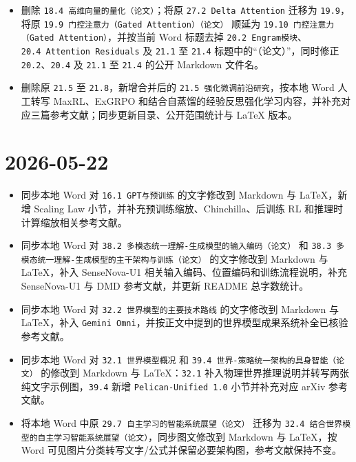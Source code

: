 \begin{itemize}
\item
  删除 \texttt{18.4\ 高维向量的量化（论文）}；将原 \texttt{27.2\ Delta\ Attention} 迁移为 \texttt{19.9}，将原 \texttt{19.9\ 门控注意力（Gated\ Attention）（论文）} 顺延为 \texttt{19.10\ 门控注意力（Gated\ Attention）}，并按当前 Word 标题去掉 \texttt{20.2\ Engram模块}、\texttt{20.4\ Attention\ Residuals} 及 \texttt{21.1} 至 \texttt{21.4} 标题中的``（论文）''，同时修正 \texttt{20.2}、\texttt{20.4} 及 \texttt{21.1} 至 \texttt{21.4} 的公开 Markdown 文件名。
\item
  删除原 \texttt{21.5} 至 \texttt{21.8}，新增合并后的 \texttt{21.5\ 强化微调前沿研究}，按本地 Word 人工转写 MaxRL、ExGRPO 和结合自蒸馏的经验反思强化学习内容，并补充对应三篇参考文献；同步更新目录、公开范围统计与 LaTeX 版本。
\end{itemize}

\hypertarget{section-3}{%
\section{2026-05-22}\label{section-3}}

\begin{itemize}
\tightlist
\item
  同步本地 Word 对 \texttt{16.1\ GPT与预训练} 的文字修改到 Markdown 与 LaTeX，新增 Scaling Law 小节，并补充预训练缩放、Chinchilla、后训练 RL 和推理时计算缩放相关参考文献。
\item
  同步本地 Word 对 \texttt{38.2\ 多模态统一理解-生成模型的输入编码（论文）} 和 \texttt{38.3\ 多模态统一理解-生成模型的主干架构与训练（论文）} 的文字修改到 Markdown 与 LaTeX，补入 SenseNova-U1 相关输入编码、位置编码和训练流程说明，补充 SenseNova-U1 与 DMD 参考文献，并更新 README 总字数统计。
\item
  同步本地 Word 对 \texttt{32.2\ 世界模型的主要技术路线} 的文字修改到 Markdown 与 LaTeX，补入 \texttt{Gemini\ Omni}，并按正文中提到的世界模型成果系统补全已核验参考文献。
\item
  同步本地 Word 对 \texttt{32.1\ 世界模型概况} 和 \texttt{39.4\ 世界-策略统一架构的具身智能（论文）} 的修改到 Markdown 与 LaTeX：\texttt{32.1} 补入物理世界推理说明并转写两张纯文字示例图，\texttt{39.4} 新增 \texttt{Pelican-Unified\ 1.0} 小节并补充对应 arXiv 参考文献。
\item
  将本地 Word 中原 \texttt{29.7\ 自主学习的智能系统展望（论文）} 迁移为 \texttt{32.4\ 结合世界模型的自主学习智能系统展望（论文）}，同步图文修改到 Markdown 与 LaTeX，按 Word 可见图片分类转写文字/公式并保留必要架构图，参考文献保持不变。
\end{itemize}


